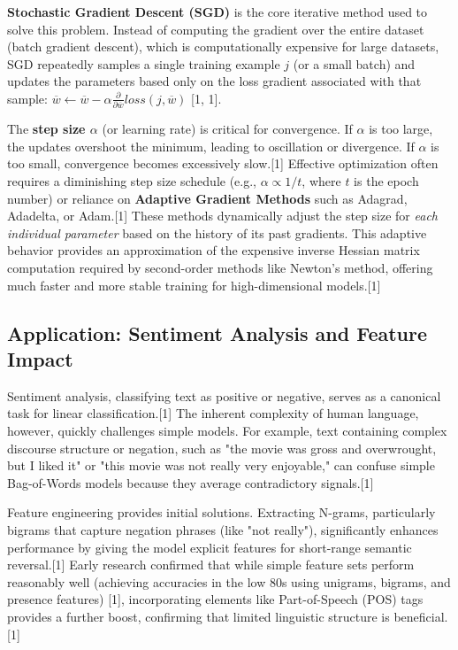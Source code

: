 \documentclass{article}
\begin{document}
\textbf{Stochastic Gradient Descent (SGD)} is the core iterative method used to solve this problem. Instead of computing the gradient over the entire dataset (batch gradient descent), which is computationally expensive for large datasets, SGD repeatedly samples a single training example $j$ (or a small batch) and updates the parameters based only on the loss gradient associated with that sample: $\overline{w} \leftarrow \overline{w} - \alpha \frac{\partial}{\partial\overline{w}} loss(j,\overline{w})$ [1, 1].

The \textbf{step size $\alpha$} (or learning rate) is critical for convergence. If $\alpha$ is too large, the updates overshoot the minimum, leading to oscillation or divergence. If $\alpha$ is too small, convergence becomes excessively slow.[1] Effective optimization often requires a diminishing step size schedule (e.g., $\alpha \propto 1/t$, where $t$ is the epoch number) or reliance on \textbf{Adaptive Gradient Methods} such as Adagrad, Adadelta, or Adam.[1] These methods dynamically adjust the step size for \textit{each individual parameter} based on the history of its past gradients. This adaptive behavior provides an approximation of the expensive inverse Hessian matrix computation required by second-order methods like Newton's method, offering much faster and more stable training for high-dimensional models.[1]

\subsection{Application: Sentiment Analysis and Feature Impact}

Sentiment analysis, classifying text as positive or negative, serves as a canonical task for linear classification.[1] The inherent complexity of human language, however, quickly challenges simple models. For example, text containing complex discourse structure or negation, such as "the movie was gross and overwrought, but I liked it" or "this movie was not really very enjoyable," can confuse simple Bag-of-Words models because they average contradictory signals.[1]

Feature engineering provides initial solutions. Extracting N-grams, particularly bigrams that capture negation phrases (like "not really"), significantly enhances performance by giving the model explicit features for short-range semantic reversal.[1] Early research confirmed that while simple feature sets perform reasonably well (achieving accuracies in the low 80s using unigrams, bigrams, and presence features) [1], incorporating elements like Part-of-Speech (POS) tags provides a further boost, confirming that limited linguistic structure is beneficial.[1]
\end{document}
